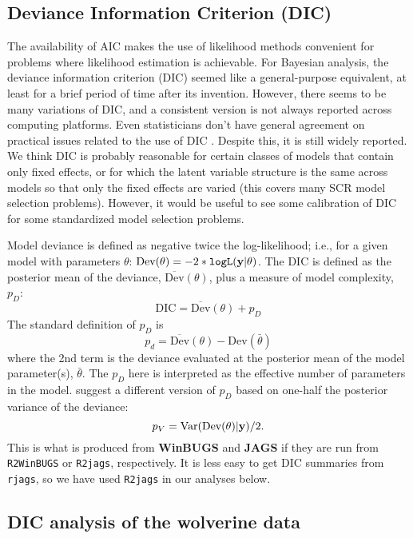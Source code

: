 \subsection{Deviance Information Criterion (DIC) }

The availability of AIC makes the use of likelihood methods convenient
for problems where likelihood estimation is achievable.  For Bayesian
analysis, the deviance information criterion (DIC) seemed like a
general-purpose equivalent, at least for a brief period of time after
its invention.  However, there seems to be many variations of DIC, and
a consistent version is not always reported across computing
platforms.
Even statisticians don't have general agreement on practical issues
related to the use of DIC \citep{millar:2009}. Despite this, it is
still widely reported. We think DIC is probably reasonable for certain
classes of models that contain only fixed effects, or for which the
latent variable structure is the same across models so that only the
fixed effects are varied (this covers many SCR model selection
problems).  However, it would be useful to see some calibration of DIC
for some standardized model selection problems.

Model deviance is defined as negative twice the log-likelihood;
i.e., for a given model with parameters $\theta$: $\mbox{Dev}(\theta) =
-2*\mbox{\tt logL}({\bf y}|\theta)$.  The DIC is defined as the
posterior mean of the deviance, $\overline{\mbox{Dev}}(\theta)$, plus a measure of model complexity,
$p_{D}$:
\[
 \mbox{DIC} = \overline{\mbox{Dev}}(\theta) + p_{D}
\]
The standard definition of $p_{D}$ is
\[
 p_{d} = \overline{\mbox{Dev}}(\theta) - \mbox{Dev}(\bar{\theta})
\]
where the 2nd term is the deviance evaluated at the posterior mean of
the model parameter(s), $\bar{\theta}$. The $p_{D}$ here is interpreted as the effective
number of parameters in the model.  \citet{gelman_etal:2004} suggest a
different version of $p_{D}$ based on one-half the posterior variance
of the deviance:
\[
 p_{V} = \mbox{Var}(\mbox{Dev}(\theta)|{\bf y})/2.
\]
This is what is produced from {\bf WinBUGS} and {\bf JAGS} if they are
run from \mbox{\tt R2WinBUGS} or \mbox{\tt R2jags}, respectively.  It
is less easy to get DIC summaries from \mbox{\tt rjags}, so we have
used \mbox{\tt R2jags} in our analyses below.


\subsection{DIC analysis of the wolverine data}

